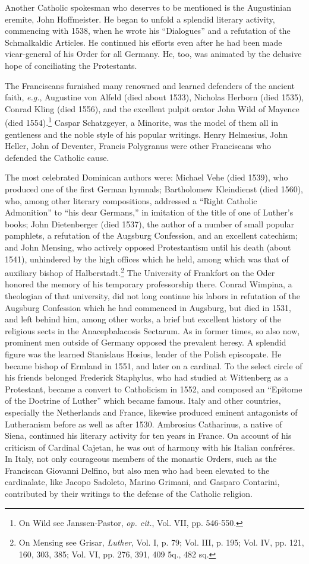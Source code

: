 Another Catholic spokesman who deserves to be mentioned is the
Augustinian eremite, John Hoffmeister. He began to unfold a splendid literary
activity, commencing with 1538, when he wrote his
“Dialogues” and a refutation of the Schmalkaldic Articles. He continued
his efforts even after he had been made vicar-general of his
Order for all Germany. He, too, was animated by the delusive hope
of conciliating the Protestants.

The Franciscans furnished many renowned and learned defenders
of the ancient faith, \textit{e.g.}, Augustine von Alfeld (died about 1533),
Nicholas Herborn (died 1535), Conrad Kling (died 1556), and the
excellent pulpit orator John Wild of Mayence (died 1554).\footnote{On Wild see Janssen-Pastor, \textit{op. cit.}, Vol. VII, pp. 546-550.}
 Caspar
Schatzgeyer, a Minorite, was the model of them all in gentleness and
the noble style of his popular writings. Henry Helmesius, John Heller,
John of Deventer, Francis Polygranus were other Franciscans who
defended the Catholic cause.

The most celebrated Dominican authors were: Michael Vehe (died
1539), who produced one of the first German hymnals; Bartholomew
Kleindienst (died 1560), who, among other literary compositions,
addressed a “Right Catholic Admonition” to “his dear Germans,” in
imitation of the title of one of Luther’s books; John Dietenberger
(died 1537), the author of a number of small popular pamphlets, a
refutation of the Augsburg Confession, and an excellent catechism;
and John Mensing, who actively opposed Protestantism until his
death (about 1541), unhindered by the high offices which he held,
among which was that of auxiliary bishop of Halberstadt.\footnote
{On Mensing see Grisar, \textit{Luther}, Vol. I, p. 79; Vol. III, p. 195; Vol. IV, pp. 121, 160,
303, 385; Vol. VI, pp. 276, 391, 409 5q., 482 sq.}
The University
of Frankfort on the Oder honored the memory of his temporary professorship
there. Conrad Wimpina, a theologian of that university, did not long continue
his labors in refutation of the Augsburg
Confession which he had commenced in Augsburg, but died in 1531,
and left behind him, among other works, a brief but excellent history
of the religious sects in the Anacepbalacosis Sectarum.
As in former times, so also now, prominent men outside of Germany
opposed the prevalent heresy. A splendid figure was the learned
Stanislaus Hosius, leader of the Polish episcopate. He became bishop
of Ermland in 1551, and later on a cardinal. To the select circle of
his friends belonged Frederick Staphylus, who had studied at Wittenberg
as a Protestant, became a convert to Catholicism in 1552, and
composed an “Epitome of the Doctrine of Luther” which became
famous. Italy and other countries, especially the Netherlands and
France, likewise produced eminent antagonists of Lutheranism before
as well as after 1530. Ambrosius Catharinus, a native of Siena, continued
his literary activity for ten years in France. On account of his
criticism of Cardinal Cajetan, he was out of harmony with his Italian
confréres. In Italy, not only courageous members of the monastic
Orders, such as the Franciscan Giovanni Delfino, but also men who
had been elevated to the cardinalate, like Jacopo Sadoleto, Marino
Grimani, and Gasparo Contarini, contributed by their writings to the
defense of the Catholic religion.
